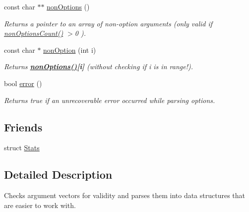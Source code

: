 \begin{DoxyCompactItemize}
const char $\ast$$\ast$ \hyperlink{class_option_parser_1_1_parser_a7366e4dae916f33bde6deecac642bb39}{non\-Options} ()
\begin{DoxyCompactList}\small\item\em Returns a pointer to an array of non-\/option arguments (only valid if {\ttfamily \hyperlink{class_option_parser_1_1_parser_a9cf3ea6206b3d832ef6cbc335e3b58e6}{non\-Options\-Count()} $>$0 }). \end{DoxyCompactList}\item 
const char $\ast$ \hyperlink{class_option_parser_1_1_parser_a5e0eef337b8d04c89189a9bfd3c6032a}{non\-Option} (int i)
\begin{DoxyCompactList}\small\item\em Returns {\bfseries {\ttfamily \hyperlink{class_option_parser_1_1_parser_a7366e4dae916f33bde6deecac642bb39}{non\-Options()}\mbox{[}i\mbox{]}}} ({\itshape without} checking if i is in range!). \end{DoxyCompactList}\item 
bool \hyperlink{class_option_parser_1_1_parser_aef1c498ad8015851c84d269640076c5b}{error} ()
\begin{DoxyCompactList}\small\item\em Returns {\ttfamily true} if an unrecoverable error occurred while parsing options. \end{DoxyCompactList}\end{DoxyCompactItemize}
\subsection*{Friends}
\begin{DoxyCompactItemize}
\item 
struct \hyperlink{class_option_parser_1_1_parser_a7183dc3501d1c87153f9c0d41f869460}{Stats}
\end{DoxyCompactItemize}


\subsection{Detailed Description}
Checks argument vectors for validity and parses them into data structures that are easier to work with. 

